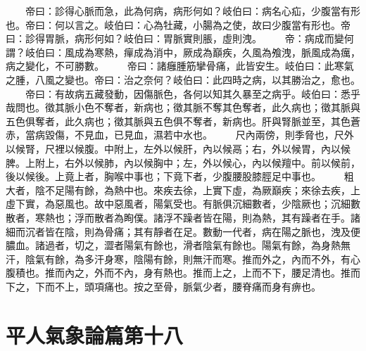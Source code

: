 　　帝曰：診得心脈而急，此為何病，病形何如？岐伯曰：病名心疝，少腹當有形也。帝曰：何以言之。岐伯曰：心為牡藏，小腸為之使，故曰少腹當有形也。帝曰：診得胃脈，病形何如？岐伯曰：胃脈實則脹，虛則洩。
　　帝：病成而變何謂？岐伯曰：風成為寒熱，癉成為消中，厥成為巔疾，久風為飧洩，脈風成為癘，病之變化，不可勝數。
　　帝曰：諸癰腫筋攣骨痛，此皆安生。岐伯曰：此寒氣之腫，八風之變也。帝曰：治之奈何？岐伯曰：此四時之病，以其勝治之，愈也。
　　帝曰：有故病五藏發動，因傷脈色，各何以知其久暴至之病乎。岐伯曰：悉乎哉問也。徵其脈小色不奪者，新病也；徵其脈不奪其色奪者，此久病也；徵其脈與五色俱奪者，此久病也；徵其脈與五色俱不奪者，新病也。肝與腎脈並至，其色蒼赤，當病毀傷，不見血，已見血，濕若中水也。
　　尺內兩傍，則季脅也，尺外以候腎，尺裡以候腹。中附上，左外以候肝，內以候鬲；右，外以候胃，內以候脾。上附上，右外以候肺，內以候胸中；左，外以候心，內以候羶中。前以候前，後以候後。上竟上者，胸喉中事也；下竟下者，少腹腰股膝脛足中事也。
　　粗大者，陰不足陽有餘，為熱中也。來疾去徐，上實下虛，為厥巔疾；來徐去疾，上虛下實，為惡風也。故中惡風者，陽氣受也。有脈俱沉細數者，少陰厥也；沉細數散者，寒熱也；浮而散者為眴僕。諸浮不躁者皆在陽，則為熱，其有躁者在手。諸細而沉者皆在陰，則為骨痛；其有靜者在足。數動一代者，病在陽之脈也，洩及便膿血。諸過者，切之，澀者陽氣有餘也，滑者陰氣有餘也。陽氣有餘，為身熱無汗，陰氣有餘，為多汗身寒，陰陽有餘，則無汗而寒。推而外之，內而不外，有心腹積也。推而內之，外而不內，身有熱也。推而上之，上而不下，腰足清也。推而下之，下而不上，頭項痛也。按之至骨，脈氣少者，腰脊痛而身有痹也。
\section{平人氣象論篇第十八}

